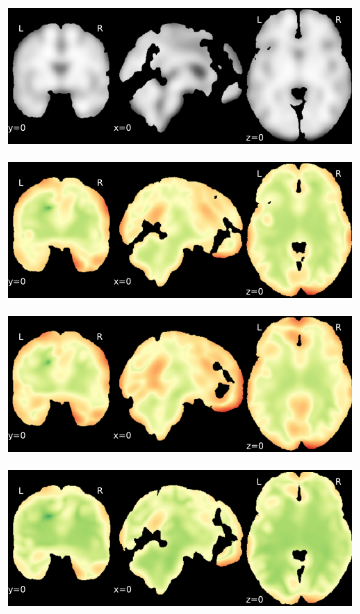 \documentclass{article}
\begin{document}
\begin{appendices}
\begin{landscape}
\begin{figure}
            \begin{subfigure}[t]{0.2\paperheight}
                \centering
                \includegraphics[width=\textwidth]{figures/sig/15mm/ieee_ds000256_sub-CTS210.pdf}
            \end{subfigure}
            \begin{subfigure}[t]{0.2\paperheight}
                \centering
                \includegraphics[width=\textwidth]{figures/sig/15mm/rr_ds000256_sub-CTS210_sig.pdf}
            \end{subfigure}
            \begin{subfigure}[t]{0.2\paperheight}
                \centering
                \includegraphics[width=\textwidth]{figures/sig/15mm/rs_ds000256_sub-CTS210_sig.pdf}
            \end{subfigure}
            \begin{subfigure}[t]{0.2\paperheight}
                \centering
                \includegraphics[width=\textwidth]{figures/sig/15mm/rr.rs_ds000256_sub-CTS210_sig.pdf}

\end{subfigure}
\end{figure}
\end{landscape}
\end{appendices}
\end{document}
